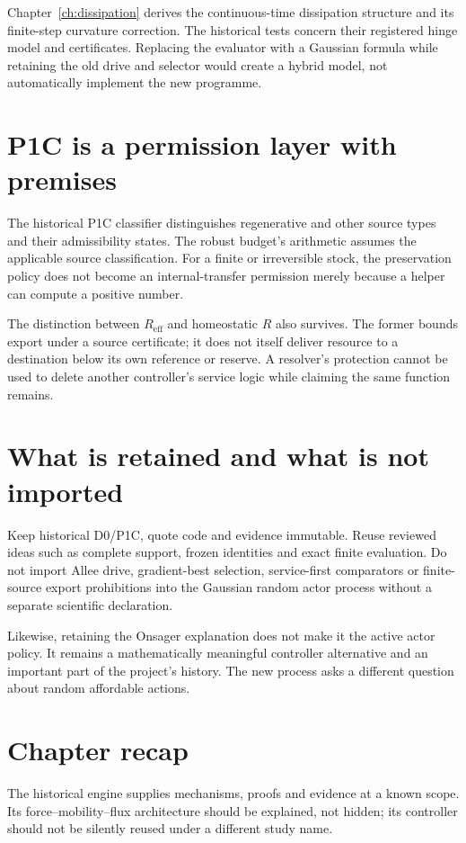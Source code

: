 Chapter~\ref{ch:dissipation} derives the continuous-time dissipation structure and its finite-step
curvature correction. The historical tests concern their registered hinge
model and certificates. Replacing the evaluator with a Gaussian formula
while retaining the old drive and selector would create a hybrid model,
not automatically implement the new programme.

\section{P1C is a permission layer with premises}
The historical P1C classifier distinguishes regenerative and other source
types and their admissibility states. The robust budget's arithmetic assumes
the applicable source classification. For a finite or irreversible stock,
the preservation policy does not become an internal-transfer permission
merely because a helper can compute a positive number.

The distinction between $R_{\mathrm{eff}}$ and homeostatic $R$ also survives.
The former bounds export under a source certificate; it does not itself
deliver resource to a destination below its own reference or reserve. A
resolver's protection cannot be used to delete another controller's service
logic while claiming the same function remains.

\section{What is retained and what is not imported}
Keep historical D0/P1C, quote code and evidence immutable. Reuse reviewed
ideas such as complete support, frozen identities and exact finite
evaluation. Do not import Allee drive, gradient-best selection, service-first
comparators or finite-source export prohibitions into the Gaussian random
actor process without a separate scientific declaration.

Likewise, retaining the Onsager explanation does not make it the active
actor policy. It remains a mathematically meaningful controller alternative
and an important part of the project's history. The new process asks a
different question about random affordable actions.

\section*{Chapter recap}
The historical engine supplies mechanisms, proofs and evidence at a known
scope. Its force--mobility--flux architecture should be explained, not hidden;
its controller should not be silently reused under a different study name.
